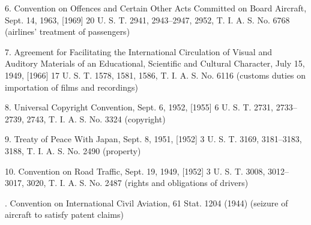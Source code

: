     6. Convention on Offences and Certain Other Acts Committed
    on Board Aircraft, Sept. 14, 1963, [1969] 20 U. S. T. 2941,
    2943--2947, 2952, T. I. A. S. No. 6768 (airlines' treatment of
    passengers)

    7. Agreement for Facilitating the International Circulation of
    Visual and Auditory Materials of an Educational, Scientific and
    Cultural Character, July 15, 1949, [1966] 17 U. S. T. 1578, 1581,
    1586, T. I. A. S. No. 6116 (customs duties on importation of films
    and recordings)

    8. Universal Copyright Convention, Sept. 6, 1952, [1955] 6 U. S.
    T. 2731, 2733--2739, 2743, T. I. A. S. No. 3324 (copyright)

    9. Treaty of Peace With Japan, Sept. 8, 1951, [1952] 3 U. S. T.
    3169, 3181--3183, 3188, T. I. A. S. No. 2490 (property)

    10. Convention on Road Traffic, Sept. 19, 1949, [1952] 3 U.
    S. T. 3008, 3012--3017, 3020, T. I. A. S. No. 2487 (rights and
    obligations of drivers)

    . Convention on International Civil Aviation, 61 Stat.
    1204 (1944) (seizure of aircraft to satisfy patent claims)
